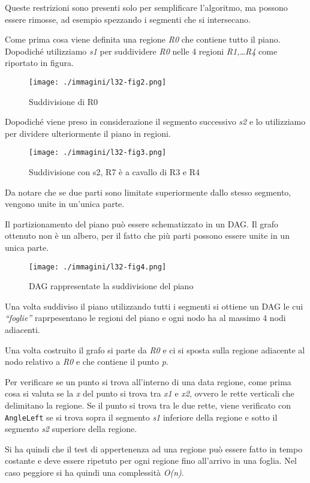 Queste restrizioni sono presenti solo per semplificare l'algoritmo, ma
possono essere rimosse, ad esempio spezzando i segmenti che si
intersecano.

Come prima cosa viene definita una regione \emph{R0} che contiene tutto
il piano. Dopodiché utilizziamo \emph{s1} per suddividere \emph{R0}
nelle 4 regioni \emph{R1,\ldots{}R4} come riportato in figura.

\begin{figure}[htbp]
\centering
\texttt{[image: ./immagini/l32-fig2.png]}
\caption{Suddivisione di R0}
\end{figure}

Dopodiché viene preso in considerazione il segmento successivo \emph{s2}
e lo utilizziamo per dividere ulteriormente il piano in regioni.

\begin{figure}[htbp]
\centering
\texttt{[image: ./immagini/l32-fig3.png]}
\caption{Suddivisione con s2, R7 è a cavallo di R3 e R4}
\end{figure}

Da notare che se due parti sono limitate superiormente dallo stesso
segmento, vengono unite in un'unica parte.

Il partizionamento del piano può essere schematizzato in un DAG. Il
grafo ottenuto non è un albero, per il fatto che più parti possono
essere unite in un unica parte.

\begin{figure}[htbp]
\centering
\texttt{[image: ./immagini/l32-fig4.png]}
\caption{DAG rappresentate la suddivisione del piano}
\end{figure}

Una volta suddiviso il piano utilizzando tutti i segmenti si ottiene un
DAG le cui \emph{``foglie''} raprpesentano le regioni del piano e ogni
nodo ha al massimo 4 nodi adiacenti.

Una volta costruito il grafo si parte da \emph{R0} e ci si sposta sulla
regione adiacente al nodo relativo a \emph{R0} e che contiene il punto
\emph{p}.

Per verificare se un punto si trova all'interno di una data regione,
come prima cosa si valuta se la \emph{x} del punto si trova tra
\emph{x1} e \emph{x2}, ovvero le rette verticali che delimitano la
regione. Se il punto si trova tra le due rette, viene verificato con
\texttt{AngleLeft} se si trova sopra il segmento \emph{s1} inferiore
della regione e sotto il segmento \emph{s2} superiore della regione.

Si ha quindi che il test di appertenenza ad una regione può essere fatto
in tempo costante e deve essere ripetuto per ogni regione fino
all'arrivo in una foglia. Nel caso peggiore si ha quindi una complessità
\emph{O(n)}.

